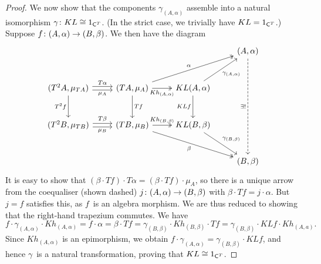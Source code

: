 \documentclass[../../solutions]{subfiles}
\begin{document}
\begin{proof}[Proof]
  We now show that the components $\gamma_{(A,\alpha)}$ assemble into
  a natural isomorphism $\gamma\colon KL\cong 1_{{\mathsf{C}}^T}$.  (In the
  strict case, we trivially have $KL=1_{{\mathsf{C}}^T}$.)  Suppose
  ${f}\colon{(A,\alpha)}\to{(B,\beta)}$.  We then have the diagram
  $$
  \begin{tikzcd}[row sep=large]
    &&& (A,\alpha)
    \ar[ddd, dashed, "\exists!"']
    \\
    (T^2A,\mu_{TA})
    \ar[r, shift left=0.5ex, "T\alpha"]
    \ar[r, shift right=0.5ex, "\mu_A"']
    \ar[d, "T^2f"']
    & (TA,\mu_A)
    \ar[r, twoheadrightarrow, "Kh_{(A,\alpha)}"']
    \ar[d, "Tf"]
    \ar[urr, twoheadrightarrow, "\alpha"]
    & KL(A,\alpha)
    \ar[d, "KLf"']
    \ar[ur, "\gamma_{(A,\alpha)}"']
    \\
    (T^2B,\mu_{TB})
    \ar[r, shift left=0.5ex, "T\beta"]
    \ar[r, shift right=0.5ex, "\mu_B"']
    & (TB,\mu_B)
    \ar[r, twoheadrightarrow, "Kh_{(B,\beta)}"]
    \ar[drr, twoheadrightarrow, "\beta"']
    & KL(B,\beta)
    \ar[dr, "\gamma_{(B,\beta)}"]
    \\
    &&& (B,\beta)
  \end{tikzcd}
  $$
  It is easy to show that
  $(\beta\cdot Tf)\cdot T\alpha = (\beta\cdot Tf)\cdot \mu_A$, so
  there is a unique arrow from the coequaliser (shown dashed)
  ${j}\colon{(A,\alpha)}\to{(B,\beta)}$ with
  $\beta\cdot Tf=j\cdot \alpha$.  But $j=f$ satisfies this, as $f$~is
  an algebra morphism.  We are thus reduced to showing that the
  right-hand trapezium commutes.  We have
  $$f\cdot \gamma_{(A,\alpha)} \cdot Kh_{(A,\alpha)}
  = f\cdot\alpha = \beta\cdot Tf = \gamma_{(B,\beta)}\cdot
  Kh_{(B,\beta)} \cdot Tf = \gamma_{(B,\beta)}\cdot KLf \cdot
  Kh_{(A,a)}.$$
  Since $Kh_{(A,\alpha)}$ is an epimorphism, we obtain $f\cdot
  \gamma_{(A,\alpha)}= \gamma_{(B,\beta)}\cdot KLf$, and hence
  $\gamma$~is a natural transformation, proving that $KL\cong
  1_{{\mathsf{C}}^T}$.


\end{proof}
\end{document}
